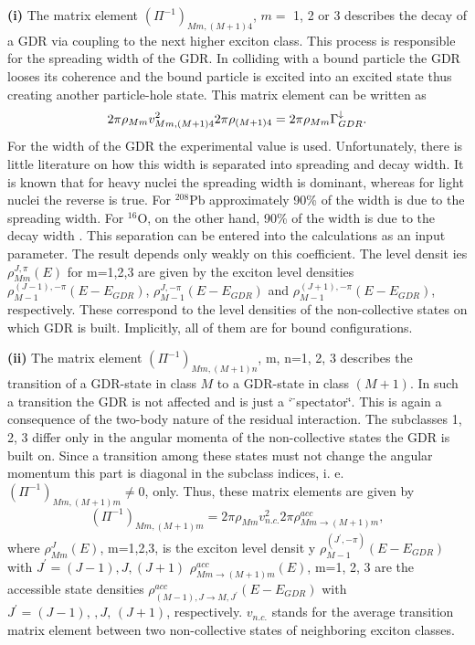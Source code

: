 \smallskip \textbf{(i)} The matrix element $(\Pi^{-1})_{Mm,(M+1)4}$, $m=$ 1,
2 or 3 describes the decay of a GDR via coupling to the next higher exciton
class. This process is responsible for the spreading width of the GDR. In
colliding with a bound particle the GDR looses its coherence and the bound
particle is excited into an excited state thus creating another
particle-hole state. This matrix element can be written as
\begin{equation}
2\pi\rho_{Mm}v_{Mm,(M+1)4}^{2}2\pi\rho_{(M+1)4}=2\pi\rho_{Mm}\Gamma_{GDR}^{%
\downarrow}.
\end{equation}
For the width of the GDR the experimental value is used. Unfortunately,
there is little literature on how this width is separated into spreading and
decay width. It is known that for heavy nuclei the spreading width is
dominant, whereas for light nuclei the reverse is true. For $^{208}$Pb
approximately 90\% of the width is due to the spreading width. For $^{16}$O,
on the other hand, 90\% of the width is due to the decay width \cite{BBB83}.
This separation can be entered into the calculations as an input parameter.
The result depends only weakly on this coefficient. The level densit%
ies $\rho_{Mm}^{J,\pi}(E)$ for m=1,2,3 are given by
the exciton level densities $\rho_{M-1}^{(J-1),-\pi}(E-E_{GDR})$, $%
\rho_{M-1}^{J,-\pi}(E-E_{GDR})$ and $\rho_{M-1}^{(J+1),-\pi}(E-E_{GDR})$,
respectively. These correspond to the level densities of the non-collective
states on which GDR is built. Implicitly, all of them are for bound
configurations.

\smallskip \textbf{(ii)} The matrix element $(\Pi^{-1})_{Mm,(M+1)n}$, m,
n=1, 2, 3 describes the transition of a GDR-state in class $M$ to a
GDR-state in class $(M+1)$. In such a transition the GDR is not affected and
is just a \char`%
\"{}spectator\char`\"{}. This is again a consequence of the two-body nature
of the residual interaction. The subclasses 1, 2, 3 differ only in the
angular momenta of the non-collective states the GDR is built on. Since a
transition among these states must not change the angular momentum this part
is diagonal in the subclass indices, i. e. $(\Pi^{-1})_{Mm,(M+1)m}\not=0$,
only. Thus, these matrix elements are given by
\begin{equation}
(\Pi^{-1})_{Mm,(M+1)m}=2\pi\rho_{Mm}v_{n.c.}^{2}2\pi\rho_{Mm%
\rightarrow(M+1)m}^{acc},
\end{equation}
where $\rho_{Mm}^{J}(E)$, m=1,2,3, is the exciton level densit%
y $\rho_{M-1}^{(J^{\prime},-\pi)}(E-E_{GDR})$
with $J^{\prime}=(J-1),J,(J+1)$ $\rho_{Mm\rightarrow(M+1)m}^{acc}(E)$, m=1,
2, 3 are the accessible state densities $\rho_{(M-1),J\rightarrow
M,J^{\prime}}^{acc}(E-E_{GDR})$ with $J^{\prime}=(J-1),\,,J,\,(J+1)$,
respectively. $v_{n.c.}$ stands for the average transition matrix element
between two non-collective states of neighboring exciton classes.


